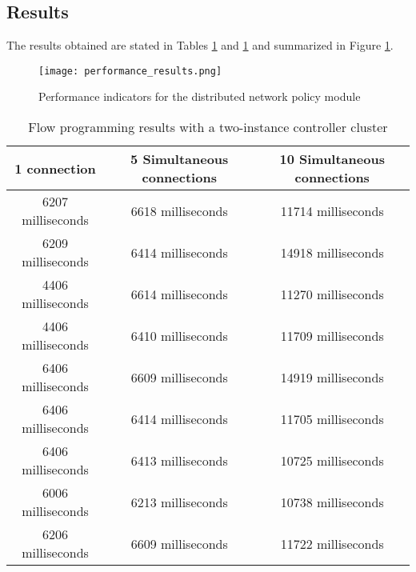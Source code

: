 \subsection{Results}
\label{subsection:performance-tests-results}
%
The results obtained are stated in Tables \ref{table:perfomance-tests-2controllers} and \ref{table:perfomance-tests-2controllers} and summarized in Figure \ref{fig:performance}.
%
\begin{figure}
	\centering
	\texttt{[image: performance\_results.png]}
	\caption{Performance indicators for the distributed network policy module}
	\label{fig:performance}
\end{figure}
%
\begin{table}[h!]
	\begin{center}
		\begin{tabular}{ | c | c | c | }
			\rowcolor{HeaderRowColor}
			\hline
			\textbf{1 connection} & \textbf{5 Simultaneous connections} & \textbf{10 Simultaneous connections}\\
			\hline
			6207 milliseconds & 6618 milliseconds & 11714 milliseconds \\
			\hline
			6209 milliseconds & 6414 milliseconds & 14918 milliseconds \\
			\hline
			4406 milliseconds & 6614 milliseconds & 11270 milliseconds \\
			\hline
			4406 milliseconds & 6410 milliseconds & 11709 milliseconds \\
			\hline
			6406 milliseconds & 6609 milliseconds & 14919 milliseconds \\
			\hline
			6406 milliseconds & 6414 milliseconds & 11705 milliseconds \\
			\hline
			6406 milliseconds & 6413 milliseconds & 10725 milliseconds \\
			\hline
			6006 milliseconds & 6213 milliseconds & 10738 milliseconds \\
			\hline
			6206 milliseconds & 6609 milliseconds & 11722 milliseconds \\
			\hline
		\end{tabular}
		\caption{Flow programming results with a two-instance controller cluster}
		\label{table:perfomance-tests-2controllers}
	\end{center}
\end{table}
%
